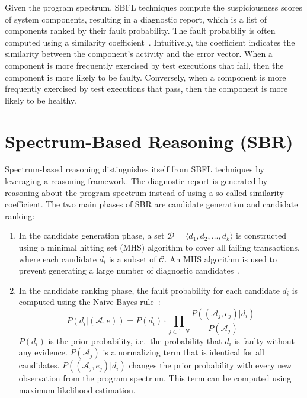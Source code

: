 \documentclass[twoside,a4paper,11pt]{memoir}
\begin{document}
Given the program spectrum, SBFL techniques compute the suspiciousness scores of system components, resulting in a diagnostic report, which is a list of components ranked by their fault probability.
The fault probabiliy is often computed using a similarity coefficient~\cite{Jones_visualizationfor, 4041886, Naish:2011:MSS:2000791.2000795, 6651713, 5772029, ERICWONG2010188, 6058639}.
Intuitively, the coefficient indicates the similarity between the component's activity and the error vector.
When a component is more frequently exercised by test executions that fail, then the component is more likely to be faulty.
Conversely, when a component is more frequently exercised by test executions that pass, then the component is more likely to be healthy.


\section{Spectrum-Based Reasoning (SBR)}%
\label{sec:sbr}
Spectrum-based reasoning distinguishes itself from SBFL techniques by leveraging a reasoning framework.
The diagnostic report is generated by reasoning about the program spectrum instead of using a so-called similarity coefficient.
The two main phases of SBR are candidate generation and candidate ranking:
\begin{enumerate}
  \item In the candidate generation phase, a set \(\mathcal{D} = \langle d_1, d_2, \dots, d_k \rangle \) is constructed using a minimal hitting set (MHS) algorithm to cover all failing transactions, where each candidate \(d_i \) is a subset of \(\mathcal{C} \).
  An MHS algorithm is used to prevent generating a large number of diagnostic candidates~\cite{Abreu:2009:SMF:1747491.1747511}.

  \item In the candidate ranking phase, the fault probability for each candidate \(d_i \) is computed using the Naive Bayes rule~\cite{Abreu:2009:SMF:1747491.1747511}:
  \begin{equation}
    P(d_i | (\mathcal{A}, e)) = P(d_i) \cdot \prod_{j \in 1..N} \frac{P((\mathcal{A}_j, e_j) | d_i)}{P(\mathcal{A}_j)}
  \end{equation}
  \(P(d_i) \) is the prior probability, i.e.\ the probability that \(d_i \) is faulty without any evidence.
  \(P(\mathcal{A}_j) \) is a normalizing term that is identical for all candidates.
  \(P((\mathcal{A}_j, e_j) | d_i) \) changes the prior probability with every new observation from the program spectrum.
  This term can be computed using maximum likelihood estimation.
\end{enumerate}
\end{document}
